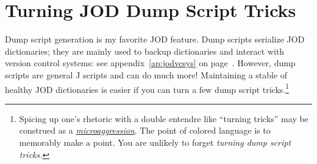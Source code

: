\section{Turning JOD Dump Script Tricks}\label{ap:joddumptricks}

Dump script generation is my favorite JOD feature. Dump scripts serialize 
JOD dictionaries; they are mainly used to backup dictionaries and interact with 
version control systems: see appendix~\ref{ap:jodvcsys} on page~\pageref{ap:jodvcsys}.
However, dump scripts are general J scripts and can do much more!  
Maintaining a stable of healthy JOD dictionaries is easier 
if you can turn a few dump script tricks.\footnote{Spicing up one's rhetoric with a double entendre 
like ``turning tricks'' may be construed as a 
\href{http://thefederalist.com/2015/03/24/microaggressions-and-trigger-warnings-meet-real-trauma/}{\emph{microaggression}}. 
The point of colored language is to memorably make a point. 
You are unlikely to forget \emph{turning dump script tricks.} 
}


